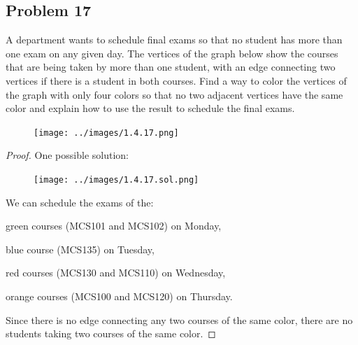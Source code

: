 \documentclass[14pt]{extarticle}
\begin{document}
\subsection{Problem 17}
A department wants to schedule final exams so that no student has more than one
exam on any given day. The vertices of the graph below show the courses that are
being taken by more than one student, with an edge connecting two vertices if
there is a student in both courses. Find a way to color the vertices of the
graph with only four colors so that no two adjacent vertices have the same color
and explain how to use the result to schedule the final exams.

\begin{figure}[ht!]
\centering
\texttt{[image: ../images/1.4.17.png]}
\end{figure}

\begin{proof}
One possible solution:
\begin{figure}[ht!]
\centering
\texttt{[image: ../images/1.4.17.sol.png]}
\end{figure}

We can schedule the exams of the:

green courses (MCS101 and MCS102) on Monday,

blue course (MCS135) on Tuesday,

red courses (MCS130 and MCS110) on Wednesday,

orange courses (MCS100 and MCS120) on Thursday.

Since there is no edge connecting any two courses of the same color, there are
no students taking two courses of the same color.
\end{proof}
\end{document}
